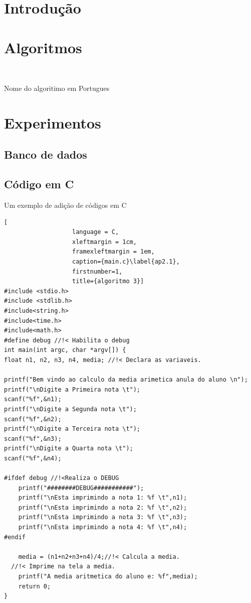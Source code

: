 
\section{Introdução}

\lipsum[2-4]

\section{Algoritmos}

\begin{algorithm}[H]
  \SetAlgoLined %
   \
    \
   \caption{Nome do algoritimo em Portugues}


\end{algorithm}

\section{Experimentos}

\lipsum[2-4]

\subsection{Banco de dados}

\lipsum[2-4]

\subsection{Código em C}
\par Um exemplo de adição de códigos em C
\begin{lstlisting}[
                   language = C,
                   xleftmargin = 1cm,
                   framexleftmargin = 1em,
                   caption={main.c}\label{ap2.1},
                   firstnumber=1,
                   title={algoritmo 3}]
#include <stdio.h>
#include <stdlib.h>
#include<string.h>
#include<time.h>
#include<math.h>
#define debug //!< Habilita o debug
int main(int argc, char *argv[]) {
float n1, n2, n3, n4, media; //!< Declara as variaveis.

printf("Bem vindo ao calculo da media arimetica anula do aluno \n");
printf("\nDigite a Primeira nota \t");
scanf("%f",&n1);
printf("\nDigite a Segunda nota \t");
scanf("%f",&n2);
printf("\nDigite a Terceira nota \t");
scanf("%f",&n3);
printf("\nDigite a Quarta nota \t");
scanf("%f",&n4);

#ifdef debug //!<Realiza o DEBUG
	printf("########DEBUG###########");
	printf("\nEsta imprimindo a nota 1: %f \t",n1);
	printf("\nEsta imprimindo a nota 2: %f \t",n2);
	printf("\nEsta imprimindo a nota 3: %f \t",n3);
	printf("\nEsta imprimindo a nota 4: %f \t",n4);
#endif

	media = (n1+n2+n3+n4)/4;//!< Calcula a media.
  //!< Imprime na tela a media.
	printf("A media aritmetica do aluno e: %f",media);
	return 0;
}

\end{lstlisting}

